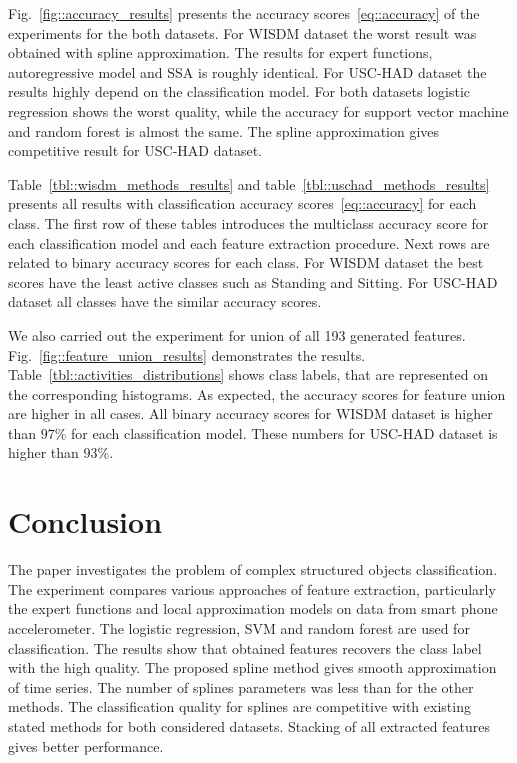 Fig.~\ref{fig::accuracy_results} presents the accuracy scores~\eqref{eq::accuracy} of the experiments for the both datasets. For WISDM dataset the worst result was obtained with spline approximation. 
The results for expert functions, autoregressive model and SSA is roughly identical. For USC-HAD dataset the results highly depend on the classification model. 
For both datasets logistic regression shows the worst quality, while the accuracy for support vector machine and random forest is almost the same. The spline approximation gives competitive result for USC-HAD dataset.

Table~\ref{tbl::wisdm_methods_results} and table~\ref{tbl::uschad_methods_results} presents all results with classification accuracy scores~\eqref{eq::accuracy} for each class. The first row of these tables introduces the multiclass accuracy score for each classification model and each feature extraction procedure. Next rows are related to binary accuracy scores for each class. For WISDM dataset the best scores have the least active classes such as Standing and Sitting. For USC-HAD dataset all classes have the similar accuracy scores.

We also carried out the experiment for union of all 193 generated features. Fig.~\ref{fig::feature_union_results} demonstrates the results. Table~\ref{tbl::activities_distributions} shows class labels, that are represented on the corresponding histograms. As expected, the accuracy scores for feature union are higher in all cases. All binary accuracy scores for WISDM dataset is higher than $97 \%$ for each classification model. These numbers for USC-HAD dataset is higher than $93 \%$.

\section{Conclusion}

The paper investigates the problem of complex structured objects classification.
The experiment compares various approaches of feature extraction, particularly the expert functions and local approximation models on data from smart phone accelerometer.
The logistic regression, SVM and random forest are used for classification. 
The results show that obtained features recovers the class label with the high quality. 
The proposed spline method gives smooth approximation of time series. 
The number of splines parameters was less than for the other methods. 
The classification quality for splines are competitive with existing stated methods for both considered datasets.  
Stacking of all extracted features gives better performance.

